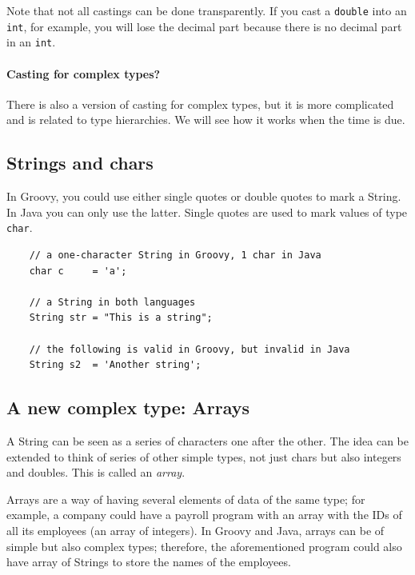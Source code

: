 Note that not all castings can be done transparently. If you cast a
\verb+double+ into an \verb+int+, for example, you will lose the
decimal part because there is no decimal part in an \verb+int+. 

\paragraph{Casting for complex types?}
\label{sec:cast-compl-types}

There is also a version of casting for complex types, but it is more
complicated and is related to type hierarchies. We will see how it
works when the time is due.

\subsection{Strings and chars}
\label{sec:strings-chars}

In Groovy, you could use either single quotes or double quotes to mark
a String. In Java you can only use the latter. Single quotes are used
to mark values of type \verb+char+. 

\begin{verbatim}
    // a one-character String in Groovy, 1 char in Java
    char c     = 'a';               

    // a String in both languages
    String str = "This is a string";

    // the following is valid in Groovy, but invalid in Java
    String s2  = 'Another string';  
\end{verbatim}

\subsection{A new complex type: Arrays}
\label{sec:arrays}

A String can be seen as a series of characters one after the
other. The idea can be extended to think of series of other simple
types, not just chars but also integers and doubles. This is called an
\emph{array}. 

Arrays are a way of having several elements of data of the same type;
for example, a company could have a payroll program with an array with
the IDs of all its employees (an array of integers). In Groovy and
Java, arrays can be of simple but also complex types; therefore, the
aforementioned program could also have array of Strings to store the
names of the employees. 

